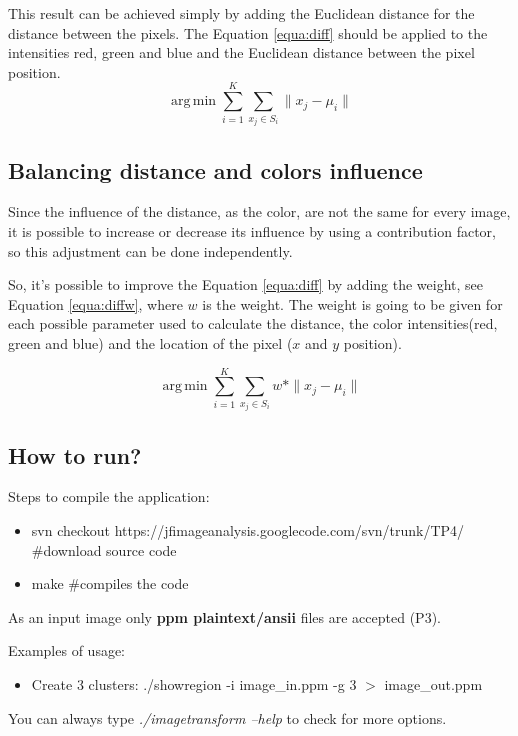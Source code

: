 \documentclass{article}
\begin{document}
This result can be achieved simply by adding the Euclidean distance for the distance between the pixels. The Equation \ref{equa:diff} should be applied to the intensities red, green and blue and the Euclidean distance between the pixel position.
\begin{equation}
 \operatorname{arg\,min}\sum_{i=1}^{K}\sum_{x_j \in S_i}^{} \|x_j-\mu_i\|
\label{equa:diff}
\end{equation}

\subsection{Balancing distance and colors influence}

Since the influence of the distance, as the color, are not the same for every image, it is possible to increase or decrease its influence by using a contribution factor, so this adjustment can be done independently.

So, it's possible to improve the Equation \ref{equa:diff} by adding the weight, see Equation \ref{equa:diffw}, where $w$ is the weight. The weight is going to be given for each possible parameter used to calculate the distance, the color intensities(red, green and blue) and the location of the pixel ($x$ and $y$ position).

\begin{equation}
 \operatorname{arg\,min}\sum_{i=1}^{K}\sum_{x_j \in S_i}^{} w*\|x_j-\mu_i\|
\label{equa:diffw}
\end{equation}


	\subsection{How to run?}

	Steps to compile the application:
	
	\begin{itemize}
		\item svn checkout https://jfimageanalysis.googlecode.com/svn/trunk/TP4/ \#download source code
		\item make \#compiles the code
	\end{itemize}

	As an input image only {\bf ppm plaintext/ansii} files are accepted (P3). 

	Examples of usage:

	\begin{itemize}
		\item Create 3 clusters:
		\subitem ./showregion -i image\_in.ppm -g 3 $>$ image\_out.ppm
	\end{itemize}

	You can always type {\it ./imagetransform --help} to check for more options. 
\end{document}
